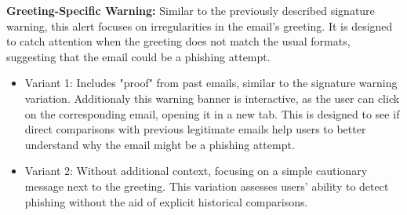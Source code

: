 \documentclass[
  a4paper,  %
  twoside,  %
  bibliography=totoc,
  headsepline,
  cleardoublepage=empty,
  parskip=half,
  draft=false
]{scrbook}
\begin{document}
\textbf{Greeting-Specific Warning:}  Similar to the previously described signature warning, this alert focuses on irregularities in the email's greeting. It is designed to catch attention when the greeting does not match the usual formats, suggesting that the email could be a phishing attempt.

\begin{itemize}
    \item Variant 1:  Includes "proof" from past emails, similar to the signature warning variation. Additionaly this warning banner is interactive, as the user can click on the corresponding email, opening it in a new tab. This is designed to see if direct comparisons with previous legitimate emails help users to better understand why the email might be a phishing attempt.
    \item Variant 2: Without additional context, focusing on a simple cautionary message next to the greeting. This variation assesses users' ability to detect phishing without the aid of explicit historical comparisons.
\end{itemize}
\end{document}

